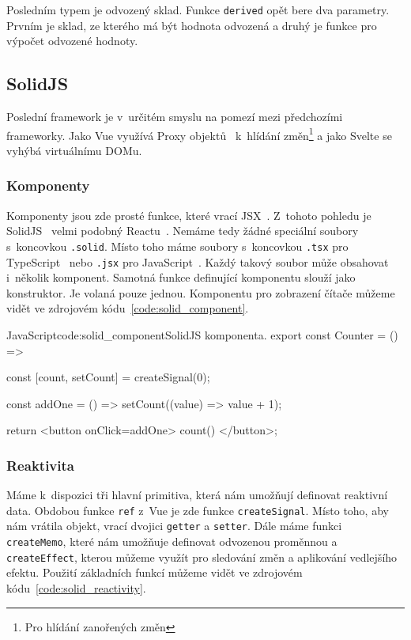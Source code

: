 \documentclass[
  master,
  program=ainf,
  printversion,
  tables=false,
  sourcecodes,
  glossaries,
  index
]{kidiplom}
\begin{document}
Posledním typem je odvozený sklad. Funkce {\tt derived} opět bere dva parametry. Prvním je sklad, ze kterého
má být hodnota odvozená a druhý je funkce pro výpočet odvozené hodnoty.

\subsection{SolidJS}

Poslední framework je v~určitém smyslu na pomezí mezi předchozími frameworky. Jako Vue využívá Proxy objektů~\cite{proxy}
k~hlídání změn\footnote{Pro hlídání zanořených změn} a jako Svelte se vyhýbá virtuálnímu DOMu.

\subsubsection{Komponenty}

Komponenty jsou zde prosté funkce, které vrací JSX~\cite{jsx}. Z~tohoto pohledu je SolidJS~\cite{solidjs} velmi podobný Reactu~\cite{react}.
Nemáme tedy žádné speciální soubory s~koncovkou {\tt .solid}. Místo toho máme soubory s~koncovkou {\tt .tsx} pro
TypeScript~\cite{ts} nebo {\tt .jsx} pro JavaScript~\cite{js}. Každý takový soubor může obsahovat i~několik komponent. Samotná
funkce definující komponentu slouží jako konstruktor. Je volaná pouze jednou. Komponentu pro zobrazení
čítače můžeme vidět ve zdrojovém kódu~\ref{code:solid_component}.

  \begin{kicode}{JavaScript}{code:solid_component}{SolidJS komponenta.}
    export const Counter = () => {
      const [count, setCount] = createSignal(0);

      const addOne = () => setCount((value) => value + 1);

      return <button onClick={addOne}> {count()} </button>;
    }
  \end{kicode}

\subsubsection{Reaktivita}

Máme k~dispozici tři hlavní primitiva, která nám umožňují definovat reaktivní data. Obdobou funkce {\tt ref}
z~Vue je zde funkce {\tt createSignal}. Místo toho, aby nám vrátila objekt, vrací dvojici {\tt getter} a {\tt setter}.
Dále máme funkci {\tt createMemo}, které nám umožňuje definovat odvozenou proměnnou a \\{\tt createEffect}, kterou 
můžeme využít pro sledování změn a aplikování vedlejšího efektu. Použití základních funkcí můžeme vidět ve 
zdrojovém kódu~\ref{code:solid_reactivity}.
\end{document}
